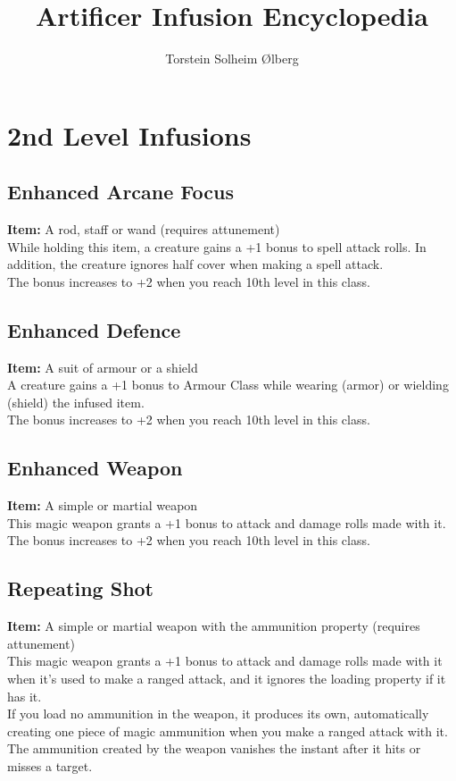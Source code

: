 \documentclass[11pt, A4paper, english]{article}
\author{Torstein Solheim Ølberg}
\title{Artificer Infusion Encyclopedia}
\begin{document}
\maketitle

\tableofcontents

	\section{2nd Level Infusions}
		\subsection{Enhanced Arcane Focus}
\textbf{Item:} A rod, staff or wand (requires attunement) \\
While holding this item, a creature gains a +1 bonus to spell attack rolls. In addition, the creature ignores half cover when making a spell attack. \\
The bonus increases to +2 when you reach 10th level in this class.

		\subsection{Enhanced Defence}
\textbf{Item:} A suit of armour or a shield \\
A creature gains a +1 bonus to Armour Class while wearing (armor) or wielding (shield) the infused item. \\
The bonus increases to +2 when you reach 10th level in this class.

		\subsection{Enhanced Weapon}
\textbf{Item:} A simple or martial weapon \\
This magic weapon grants a +1 bonus to attack and damage rolls made with it. \\
The bonus increases to +2 when you reach 10th level in this class.

		\subsection{Repeating Shot}
\textbf{Item:} A simple or martial weapon with the ammunition property (requires attunement) \\
This magic weapon grants a +1 bonus to attack and damage rolls made with it when it's used to make a ranged attack, and it ignores the loading property if it has it. \\
If you load no ammunition in the weapon, it produces its own, automatically creating one piece of magic ammunition when you make a ranged attack with it. The ammunition created by the weapon vanishes the instant after it hits or misses a target.
\end{document}
